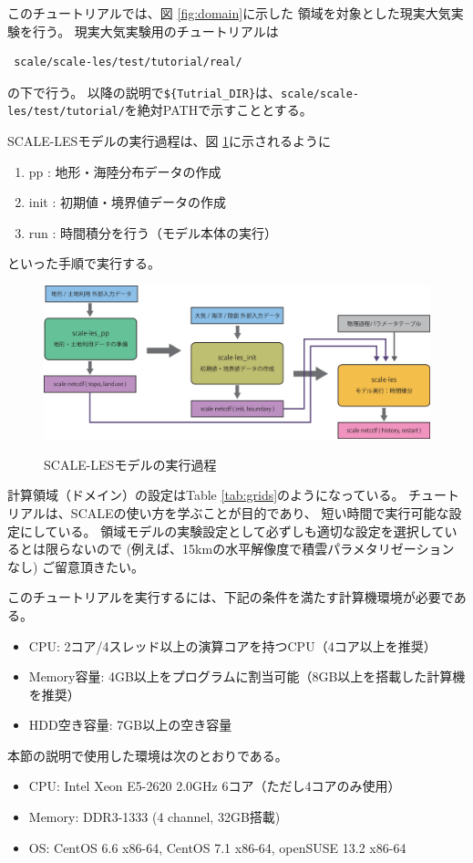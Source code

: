 
このチュートリアルでは、図 \ref{fig:domain}に示した
領域を対象とした現実大気実験を行う。
現実大気実験用のチュートリアルは
\begin{verbatim}
 scale/scale-les/test/tutorial/real/
\end{verbatim}
の下で行う。
以降の説明で\verb|${Tutrial_DIR}|は、\verb|scale/scale-les/test/tutorial/|を絶対PATHで示すこととする。

SCALE-LESモデルの実行過程は、図 \ref{fig:howto}に示されるように
\begin{enumerate}
\item pp : 地形・海陸分布データの作成
\item init : 初期値・境界値データの作成
\item run : 時間積分を行う（モデル本体の実行）
\end{enumerate}
といった手順で実行する。


\begin{figure}[h]
\begin{center}
  \includegraphics[width=0.9\hsize]{./figure/how_to_run.eps}\\
  \caption{SCALE-LESモデルの実行過程}
  \label{fig:howto}
\end{center}
\end{figure}

計算領域（ドメイン）の設定はTable \ref{tab:grids}のようになっている。
チュートリアルは、SCALEの使い方を学ぶことが目的であり、
短い時間で実行可能な設定にしている。
領域モデルの実験設定として必ずしも適切な設定を選択しているとは限らないので
(例えば、15kmの水平解像度で積雲パラメタリゼーションなし)
ご留意頂きたい。

このチュートリアルを実行するには、下記の条件を満たす計算機環境が必要である。
\begin{itemize}
\item CPU: 2コア/4スレッド以上の演算コアを持つCPU（4コア以上を推奨）
\item Memory容量: 4GB以上をプログラムに割当可能（8GB以上を搭載した計算機を推奨）
\item HDD空き容量: 7GB以上の空き容量
\end{itemize}
本節の説明で使用した環境は次のとおりである。
\begin{itemize}
\item CPU: Intel Xeon E5-2620 2.0GHz 6コア（ただし4コアのみ使用）
\item Memory: DDR3-1333 (4 channel, 32GB搭載)
\item OS: CentOS 6.6 x86-64, CentOS 7.1 x86-64, openSUSE 13.2 x86-64
\end{itemize}

